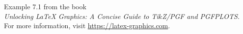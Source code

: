\documentclass{article}
\begin{document}
Example 7.1 from the book\\
\emph{Unlocking LaTeX Graphics: A Concise Guide to Ti$k$Z/PGF and PGFPLOTS}.\\
For more information, visit \url{https://latex-graphics.com}.
\par\bigskip

\end{document}
